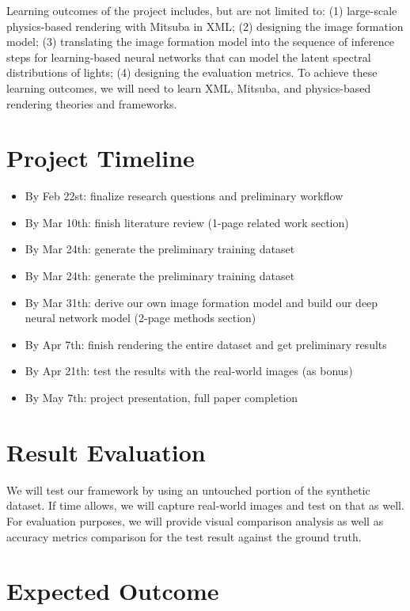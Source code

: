 \documentclass[final]{cvpr}
\begin{document}
Learning outcomes of the project includes, but are not limited to: (1) large-scale physics-based rendering with Mitsuba in XML; (2) designing the image formation model; (3) translating the image formation model into the sequence of inference steps for learning-based neural networks that can model the latent spectral distributions of lights; (4) designing the evaluation metrics. To achieve these learning outcomes, we will need to learn XML, Mitsuba, and physics-based rendering theories and frameworks.


\section{Project Timeline}
\begin{itemize}
    \item By Feb 22st: finalize research questions and preliminary workflow
    \item By Mar 10th: finish literature review (1-page related work section)
    \item By Mar 24th: generate the preliminary training dataset
    \item By Mar 24th: generate the preliminary training dataset
    \item By Mar 31th: derive our own image formation model and build our deep neural network model (2-page methods section)
    \item By  Apr 7th: finish rendering the entire dataset and get preliminary results
    \item By Apr 21th: test the results with the real-world images (as bonus)
    \item By May 7th: project presentation, full paper completion
\end{itemize}

\section{Result Evaluation}
We will test our framework by using an untouched portion of the synthetic dataset. If time allows, we will capture real-world images and test on that as well. For evaluation purposes, we will provide visual comparison analysis as well as accuracy metrics comparison for the test result against the ground truth.

\section{Expected Outcome}
\end{document}
